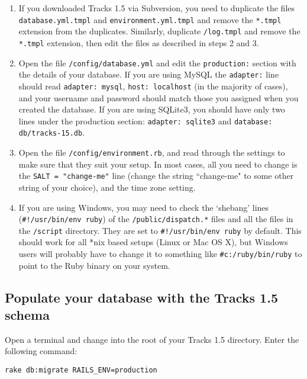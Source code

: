 \documentclass[10pt,twoside]{memoir}
\begin{document}
\begin{enumerate}


\item If you downloaded Tracks 1.5 via Subversion, you need to duplicate the files \texttt{database.yml.tmpl} and \texttt{environment.yml.tmpl} and remove the \texttt{*.tmpl} extension from the duplicates. Similarly, duplicate \texttt{/log.tmpl} and remove the \texttt{*.tmpl} extension, then edit the files as described in steps 2 and 3.

\item Open the file \texttt{/config/database.yml} and edit the \texttt{production:} section with the details of your database. If you are using MySQL the \texttt{adapter:} line should read \texttt{adapter: mysql}, \texttt{host: localhost} (in the majority of cases), and your username and password should match those you assigned when you created the database. If you are using SQLite3, you should have only two lines under the production section: \texttt{adapter: sqlite3} and \texttt{database: db/tracks-15.db}.

\item Open the file \texttt{/config/environment.rb}, and read through the settings to make sure that they suit your setup. In most cases, all you need to change is the \texttt{SALT = "change-me"} line (change the string ``change-me" to some other string of your choice), and the time zone setting.

\item If you are using Windows, you may need to check the `shebang' lines (\texttt{\#!/usr/bin/env ruby}) of the \texttt{/public/dispatch.*} files and all the files in the \texttt{/script} directory. They are set to \texttt{\#!/usr/bin/env ruby} by default. This should work for all *nix based setups (Linux or Mac OS X), but Windows users will probably have to change it to something like \texttt{\#c:/ruby/bin/ruby} to point to the Ruby binary on your system.
\end{enumerate}

\subsection{Populate your database with the Tracks 1.5 schema}
\label{rake_install}

Open a terminal and change into the root of your Tracks 1.5 directory. Enter the following command:


\texttt{rake db:migrate RAILS\_ENV=production}
\end{document}
